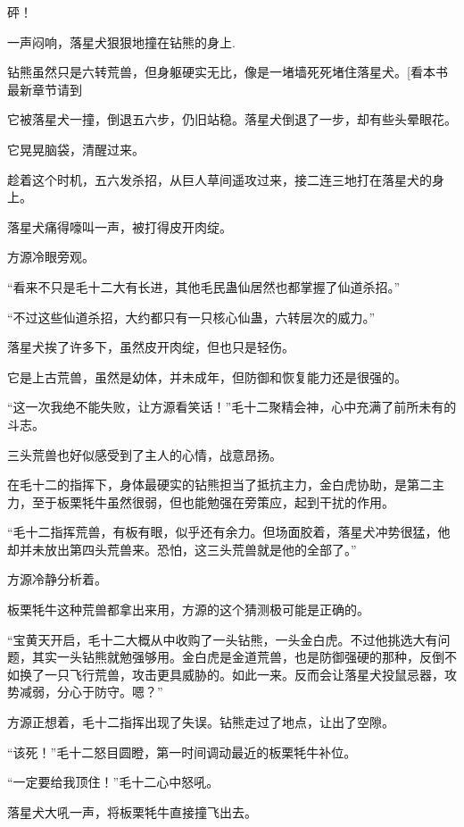 
\begin{this_body}

砰！

一声闷响，落星犬狠狠地撞在钻熊的身上.

钻熊虽然只是六转荒兽，但身躯硬实无比，像是一堵墙死死堵住落星犬。[看本书最新章节请到

它被落星犬一撞，倒退五六步，仍旧站稳。落星犬倒退了一步，却有些头晕眼花。

它晃晃脑袋，清醒过来。

趁着这个时机，五六发杀招，从巨人草间遥攻过来，接二连三地打在落星犬的身上。

落星犬痛得嚎叫一声，被打得皮开肉绽。

方源冷眼旁观。

“看来不只是毛十二大有长进，其他毛民蛊仙居然也都掌握了仙道杀招。”

“不过这些仙道杀招，大约都只有一只核心仙蛊，六转层次的威力。”

落星犬挨了许多下，虽然皮开肉绽，但也只是轻伤。

它是上古荒兽，虽然是幼体，并未成年，但防御和恢复能力还是很强的。

“这一次我绝不能失败，让方源看笑话！”毛十二聚精会神，心中充满了前所未有的斗志。

三头荒兽也好似感受到了主人的心情，战意昂扬。

在毛十二的指挥下，身体最硬实的钻熊担当了抵抗主力，金白虎协助，是第二主力，至于板栗牦牛虽然很弱，但也能勉强在旁策应，起到干扰的作用。

“毛十二指挥荒兽，有板有眼，似乎还有余力。但场面胶着，落星犬冲势很猛，他却并未放出第四头荒兽来。恐怕，这三头荒兽就是他的全部了。”

方源冷静分析着。

板栗牦牛这种荒兽都拿出来用，方源的这个猜测极可能是正确的。

“宝黄天开启，毛十二大概从中收购了一头钻熊，一头金白虎。不过他挑选大有问题，其实一头钻熊就勉强够用。金白虎是金道荒兽，也是防御强硬的那种，反倒不如换了一只飞行荒兽，攻击更具威胁的。如此一来。反而会让落星犬投鼠忌器，攻势减弱，分心于防守。嗯？”

方源正想着，毛十二指挥出现了失误。钻熊走过了地点，让出了空隙。

“该死！”毛十二怒目圆瞪，第一时间调动最近的板栗牦牛补位。

“一定要给我顶住！”毛十二心中怒吼。

落星犬大吼一声，将板栗牦牛直接撞飞出去。


\end{this_body}
